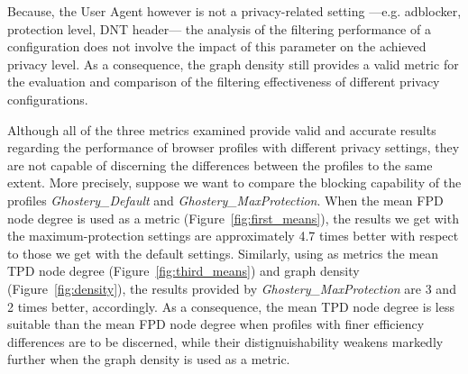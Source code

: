 Because, the User Agent however is not a privacy-related setting ---e.g. adblocker, protection level, DNT header--- the analysis of the filtering performance of a configuration does not involve the impact of this parameter on the achieved privacy level. As a consequence, the graph density still provides a valid metric for the evaluation and comparison of the filtering effectiveness of different privacy configurations.

Although all of the three metrics examined provide valid and accurate results regarding the performance of browser profiles with different privacy settings, they are not capable of discerning the differences between the profiles to the same extent. More precisely, suppose we want to compare the blocking capability of the profiles \textit{Ghostery\_\allowbreak Default} and \textit{Ghostery\_\allowbreak MaxProtection}. When the mean FPD node degree is used as a metric (Figure~\ref{fig:first_means}), the results we get with the maximum-protection settings are approximately 4.7 times better with respect to those we get with the default settings. Similarly, using as metrics the mean TPD node degree (Figure~\ref{fig:third_means}) and graph density (Figure~\ref{fig:density}), the results provided by \textit{Ghostery\_\allowbreak MaxProtection} are 3 and 2 times better, accordingly.
As a consequence, the mean TPD node degree is less suitable than the mean FPD node degree when profiles with finer efficiency differences are to be discerned, while their distignuishability weakens markedly further when the graph density is used as a metric.

